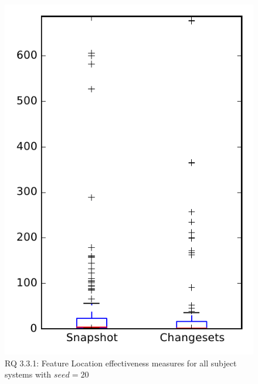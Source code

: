 
\begin{figure}
\centering
\includegraphics[height=0.4\textheight]{figures/flt_seed/rq1_overview_20}
\caption{RQ 3.3.1: Feature Location effectiveness measures for all subject systems with $seed=20$}
\label{fig:flt_seed:rq1:overview}
\end{figure}
